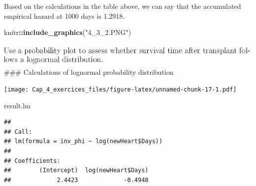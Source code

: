 \documentclass[
]{article}
\newenvironment{Shaded}{\begin{snugshade}}{\end{snugshade}}
\newcommand{\DataTypeTok}[1]{\textcolor[rgb]{0.13,0.29,0.53}{#1}}
\newcommand{\DecValTok}[1]{\textcolor[rgb]{0.00,0.00,0.81}{#1}}
\newcommand{\KeywordTok}[1]{\textcolor[rgb]{0.13,0.29,0.53}{\textbf{#1}}}
\newcommand{\NormalTok}[1]{#1}
\newcommand{\OperatorTok}[1]{\textcolor[rgb]{0.81,0.36,0.00}{\textbf{#1}}}
\newcommand{\StringTok}[1]{\textcolor[rgb]{0.31,0.60,0.02}{#1}}
\begin{document}
Based on the calculations in the table above, we can say that the
accumulated empirical hazard at 1000 days is 1.2918.

\begin{Shaded}
\begin{Highlighting}[]
\NormalTok{knitr}\OperatorTok{::}\KeywordTok{include_graphics}\NormalTok{(}\StringTok{"4_3_2.PNG"}\NormalTok{)}
\end{Highlighting}
\end{Shaded}

\includegraphics[width=8.61in]{4_3_2} \#\#\# Calculations of lognormal
probability distribution

\begin{Shaded}
\end{Shaded}

\texttt{[image: Cap\_4\_exercices\_files/figure-latex/unnamed-chunk-17-1.pdf]}

\begin{Shaded}
\begin{Highlighting}[]
\NormalTok{result.lm}
\end{Highlighting}
\end{Shaded}

\begin{verbatim}
## 
## Call:
## lm(formula = inv_phi ~ log(newHeart$Days))
## 
## Coefficients:
##        (Intercept)  log(newHeart$Days)  
##             2.4423             -0.4948
\end{verbatim}
\end{document}

